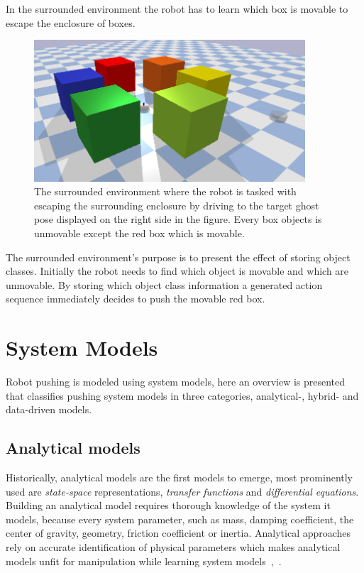 In the surrounded environment the robot has to learn which box is movable to escape the enclosure of boxes.\bs
\begin{figure}[H]
  \centering
  \includegraphics[width=0.9\textwidth]{figures/results/surrounded}
  \caption{The surrounded environment where the robot is tasked with escaping the surrounding enclosure by driving to the target ghost pose displayed on the right side in the figure. Every box objects is unmovable except the red box which is movable.}%
  \label{fig:benchmark_surrounded}
\end{figure}
The surrounded environment's purpose is to present the effect of storing object classes. Initially the robot needs to find which object is movable and which are unmovable. By storing which object class information a generated action sequence immediately decides to push the movable red box.\bs

\chapter*{System Models}%
Robot pushing is modeled using system models, here an overview is presented that classifies pushing system models in three categories, analytical-, hybrid- and data-driven models.\bs

\section*{Analytical models}
Historically, analytical models are the first models to emerge, most prominently used are \textit{state-space} representations, \textit{transfer functions} and \textit{differential equations}. Building an analytical model requires thorough knowledge of the system it models, because every system parameter, such as mass, damping coefficient, the center of gravity, geometry, friction coefficient or inertia. Analytical approaches rely on accurate identification of physical parameters which makes analytical models unfit for manipulation while learning system models~\cite{arruda_uncertainty_2017},~\cite{stuber_featurebased_2018}.\\

